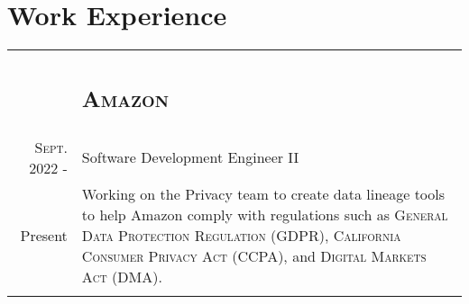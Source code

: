 \documentclass[letterpaper,10pt]{article}
\newenvironment{table_itemize}
{
	\begingroup
	\begin{minipage}[t]{\hsize}
	\footnotesize
	\raggedright
    \begin{itemize}
	\itemsep 0pt
}{
	\end{itemize}
	\end{minipage}
	\smallskip
	\endgroup
}
\begin{document}
\section{Work Experience}
\begin{tabular}{R|B}

	                                & \subsection{\textsc{Amazon}}                                                                   \\
	\textsc{Sept.} 2022 -           & Software Development Engineer II                                                               \\
	Present\phantom{ -}             %
	                                & \footnotesize Working on the Privacy team to create data lineage tools to help
	Amazon comply with regulations such as \textsc{General Data Protection Regulation (GDPR), California Consumer Privacy Act (CCPA)},
	and \textsc{Digital Markets Act (DMA)}.                                                                                          \\
	                                                                                                             \\


\end{tabular}
\end{document}
